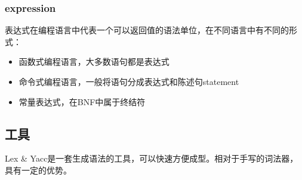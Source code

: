 \subsubsection{expression}
表达式在编程语言中代表一个可以返回值的语法单位，在不同语言中有不同的形式：
\begin{itemize}
    \item {函数式编程语言，大多数语句都是表达式}
    \item {命令式编程语言，一般将语句分成表达式和陈述句statement}
    \item {常量表达式，在BNF中属于终结符}
\end{itemize}

\subsection{工具}
Lex \& Yacc是一套生成语法的工具，可以快速方便成型。相对于手写的词法器，具有一定的优势。
